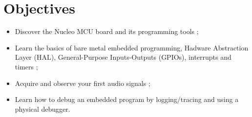 \section*{Objectives}

\begin{itemize}
    \item Discover the Nucleo MCU board and its programming tools ;
    \item Learn the basics of bare metal embedded programming, Hadware Abstraction Layer (HAL), General-Purpose Inputs-Outputs (GPIOs), interrupts and timers ;
    \item Acquire and observe your first audio signals ;
    \item Learn how to debug an embedded program by logging/tracing and using a physical debugger.
\end{itemize}

